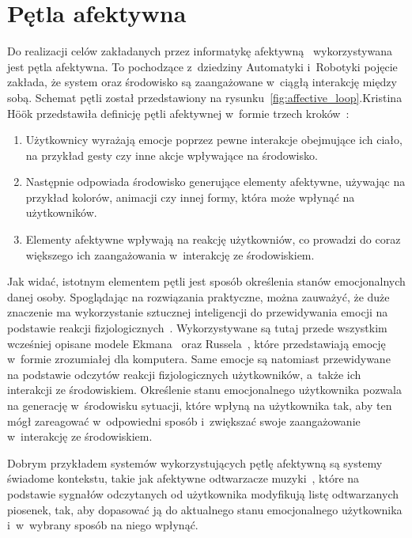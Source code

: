 \section{Pętla afektywna}
Do realizacji celów zakładanych przez informatykę afektywną~\cite{Picard:1997:AC:265013} wykorzystywana jest pętla afektywna. To pochodzące z~dziedziny Automatyki i~Robotyki pojęcie zakłada, że system oraz środowisko są zaangażowane w~ciągłą interakcję między sobą. Schemat pętli został przedstawiony na rysunku~\ref{fig:affective_loop}.\newpage Kristina Höök przedstawiła definicję pętli afektywnej w~formie trzech kroków~\cite{affective_loop_experiences}:
\begin{enumerate}
	\item Użytkownicy wyrażają emocje poprzez pewne  interakcje obejmujące ich ciało, na przykład gesty czy inne akcje wpływające na środowisko.
	\item Następnie odpowiada środowisko generujące elementy afektywne, używając na przykład kolorów, animacji czy innej formy, która może wpłynąć na użytkowników.
	\item Elementy afektywne wpływają na reakcję użytkowniów, co prowadzi do coraz większego ich zaangażowania w~interakcję ze środowiskiem.
\end{enumerate}

Jak widać, istotnym elementem pętli jest sposób określenia stanów emocjonalnych danej osoby. Spoglądając na rozwiązania praktyczne, można zauważyć, że duże znaczenie ma wykorzystanie sztucznej inteligencji do przewidywania emocji na podstawie reakcji fizjologicznych~\cite{emotional_context_geist_2019}. Wykorzystywane są tutaj przede wszystkim wcześniej opisane modele Ekmana~\cite{Ekman1971ConstantsAC} oraz Russela~\cite{circumplex_model_russel_1980}, które przedstawiają emocję w~formie zrozumiałej dla komputera. Same emocje są natomiast przewidywane na podstawie odczytów reakcji fizjologicznych użytkowników, a~także ich interakcji ze środowiskiem. Określenie stanu emocjonalnego użytkownika pozwala na generację w~środowisku sytuacji, które wpłyną na użytkownika tak, aby ten mógł zareagować w~odpowiedni sposób i~zwiększać swoje zaangażowanie w~interakcję ze środowiskiem. 

Dobrym przykładem systemów wykorzystujących pętlę afektywną są systemy świadome kontekstu, takie jak afektywne odtwarzacze muzyki~\cite{Janssen2012,ChrzanowskaInzynierska}, które na podstawie sygnałów odczytanych od użytkownika modyfikują listę odtwarzanych piosenek, tak, aby dopasować ją do aktualnego stanu emocjonalnego użytkownika i~w~wybrany sposób na niego wpłynąć.

